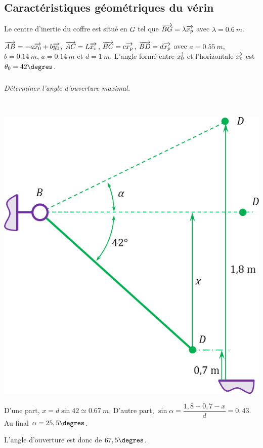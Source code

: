 \documentclass[10pt,fleqn]{article} %
\begin{document}
\begin{multicols}{2}
\begin{multicols}{2}
\subsection*{Caractéristiques géométriques du vérin}
Le centre d’inertie du coffre est situé en $G$ tel que $\overrightarrow{BG}=\lambda\overrightarrow{x_p}$ avec $\lambda=\SI{0,6}{m}$.

$\overrightarrow{AB}=-a\overrightarrow{x_0}+b\overrightarrow{y_0}$, $\overrightarrow{AC}=L\overrightarrow{x_v}$, $\overrightarrow{BC}=c\overrightarrow{x_p}$, $\overrightarrow{BD}=d\overrightarrow{x_p}$ avec $a=\SI{0,55}{m}$, $b=\SI{0,14}{m}$, $a=\SI{0,14}{m}$  et $d=\SI{1}{m}$. L’angle formé entre $\overrightarrow{x_0}$ et l’horizontale $\overrightarrow{x_t}$ est $\theta_0 = 42\degres$.

\subparagraph{}
\textit{Déterminer l’angle d’ouverture maximal.}
\ifprof
\begin{corrige}~\\
\begin{center}
\includegraphics[width=\linewidth]{images/cor_01}
\end{center}
D'une part, $x = d\sin 42 \simeq \SI{0,67}{m}$. D'autre part, $\sin\alpha = \dfrac{1,8-0,7-x}{d}=0,43$. Au final $\alpha = 25,5\degres$. 

L'angle d'ouverture est donc de $67,5\degres$.


\end{corrige}
\end{multicols}
\end{multicols}
\end{document}
